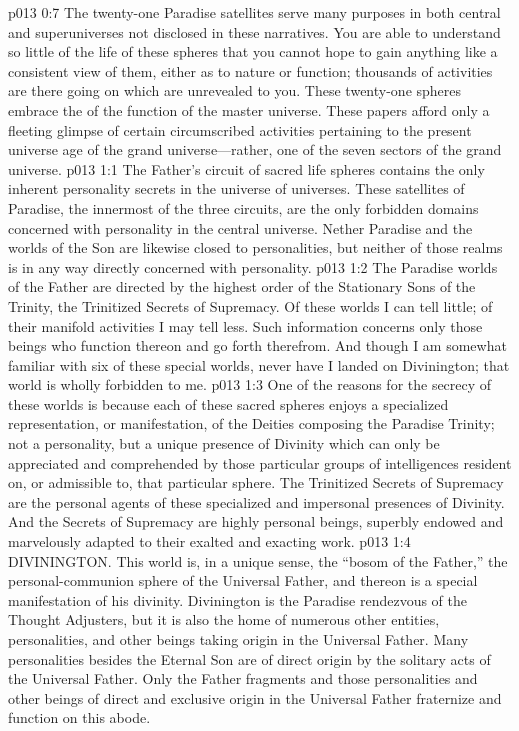 \vs p013 0:7 The twenty\hyp{}one Paradise satellites serve many purposes in both central and superuniverses not disclosed in these narratives. You are able to understand so little of the life of these spheres that you cannot hope to gain anything like a consistent view of them, either as to nature or function; thousands of activities are there going on which are unrevealed to you. These twenty\hyp{}one spheres embrace the  of the function of the master universe. These papers afford only a fleeting glimpse of certain circumscribed activities pertaining to the present universe age of the grand universe---rather, one of the seven sectors of the grand universe.
\vs p013 1:1 The Father’s circuit of sacred life spheres contains the only inherent personality secrets in the universe of universes. These satellites of Paradise, the innermost of the three circuits, are the only forbidden domains concerned with personality in the central universe. Nether Paradise and the worlds of the Son are likewise closed to personalities, but neither of those realms is in any way directly concerned with personality.
\vs p013 1:2 The Paradise worlds of the Father are directed by the highest order of the Stationary Sons of the Trinity, the Trinitized Secrets of Supremacy. Of these worlds I can tell little; of their manifold activities I may tell less. Such information concerns only those beings who function thereon and go forth therefrom. And though I am somewhat familiar with six of these special worlds, never have I landed on Divinington; that world is wholly forbidden to me.
\vs p013 1:3 One of the reasons for the secrecy of these worlds is because each of these sacred spheres enjoys a specialized representation, or manifestation, of the Deities composing the Paradise Trinity; not a personality, but a unique presence of Divinity which can only be appreciated and comprehended by those particular groups of intelligences resident on, or admissible to, that particular sphere. The Trinitized Secrets of Supremacy are the personal agents of these specialized and impersonal presences of Divinity. And the Secrets of Supremacy are highly personal beings, superbly endowed and marvelously adapted to their exalted and exacting work.
\pc \vs p013 1:4 \bibnobreakspace DIVININGTON. This world is, in a unique sense, the “bosom of the Father,” the personal\hyp{}communion sphere of the Universal Father, and thereon is a special manifestation of his divinity. Divinington is the Paradise rendezvous of the Thought Adjusters, but it is also the home of numerous other entities, personalities, and other beings taking origin in the Universal Father. Many personalities besides the Eternal Son are of direct origin by the solitary acts of the Universal Father. Only the Father fragments and those personalities and other beings of direct and exclusive origin in the Universal Father fraternize and function on this abode.
